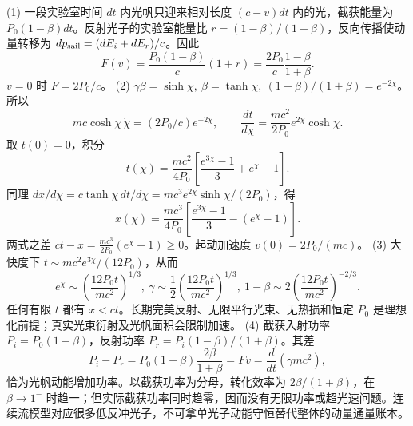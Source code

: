 (1) 一段实验室时间 \(dt\) 内光帆只迎来相对长度 \((c-v)dt\) 内的光，截获能量为 \(P_0(1-\beta)dt\)。反射光子的实验室能量比 \(r=(1-\beta)/(1+\beta)\)，反向传播使动量转移为 \(d p_{\rm sail}=(dE_i+dE_r)/c\)。因此
\[
F(v)=\frac{P_0(1-\beta)}c(1+r)
=\frac{2P_0}{c}\frac{1-\beta}{1+\beta}.
\]
\(v=0\) 时 \(F=2P_0/c\)。
(2) \(\gamma\beta=\sinh\chi,\ \beta=\tanh\chi,\ (1-\beta)/(1+\beta)=e^{-2\chi}\)。所以
\[
mc\cosh\chi\,\dot\chi=(2P_0/c)e^{-2\chi},
\qquad \frac{dt}{d\chi}=\frac{mc^2}{2P_0}e^{2\chi}\cosh\chi.
\]
取 \(t(0)=0\)，积分
\[
t(\chi)=\frac{mc^2}{4P_0}\left[\frac{e^{3\chi}-1}{3}+e^\chi-1\right].
\]
同理 \(dx/d\chi=c\tanh\chi\,dt/d\chi=mc^3e^{2\chi}\sinh\chi/(2P_0)\)，得
\[
x(\chi)=\frac{mc^3}{4P_0}\left[\frac{e^{3\chi}-1}{3}-(e^\chi-1)\right].
\]
两式之差 \(ct-x=\frac{mc^3}{2P_0}(e^\chi-1)\ge0\)。起动加速度 \(\dot v(0)=2P_0/(mc)\)。
(3) 大快度下 \(t\sim mc^2e^{3\chi}/(12P_0)\)，从而
\[
e^\chi\sim\left(\frac{12P_0t}{mc^2}\right)^{1/3},\
\gamma\sim\frac12\left(\frac{12P_0t}{mc^2}\right)^{1/3},\
1-\beta\sim2\left(\frac{12P_0t}{mc^2}\right)^{-2/3}.
\]
任何有限 \(t\) 都有 \(x<ct\)。长期完美反射、无限平行光束、无热损和恒定 \(P_0\) 是理想化前提；真实光束衍射及光帆面积会限制加速。
(4) 截获入射功率 \(P_i=P_0(1-\beta)\)，反射功率 \(P_r=P_i(1-\beta)/(1+\beta)\)。其差
\[
P_i-P_r=P_0(1-\beta)\frac{2\beta}{1+\beta}
=Fv=\frac d{dt}(\gamma mc^2),
\]
恰为光帆动能增加功率。以截获功率为分母，转化效率为 \(2\beta/(1+\beta)\)，在 \(\beta\to1^-\) 时趋一；但实际截获功率同时趋零，因而没有无限功率或超光速问题。连续流模型对应很多低反冲光子，不可拿单光子动能守恒替代整体的动量通量账本。
